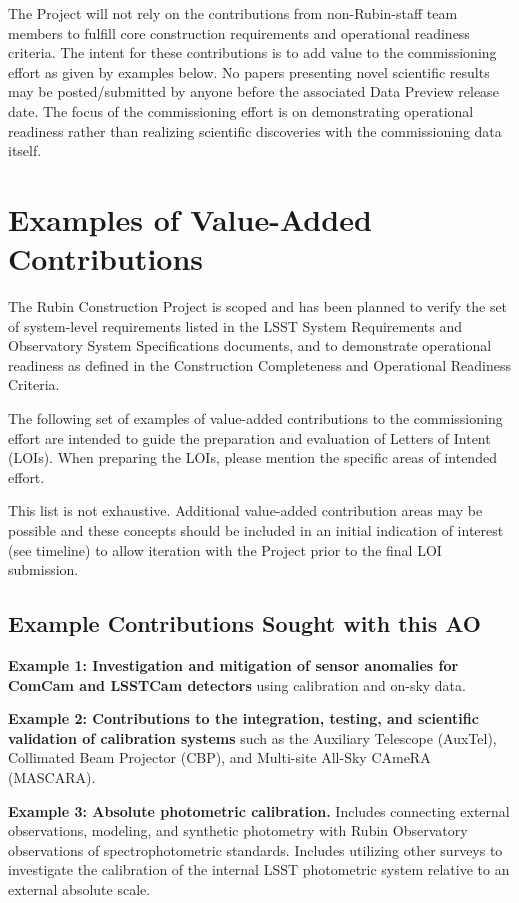 \documentclass[SE,authoryear,toc]{lsstdoc}
\begin{document}
The Project will not rely on the contributions from non-Rubin-staff team members to fulfill core construction requirements and operational readiness criteria. The intent for these contributions is to add value to the commissioning effort as given by examples below.  No papers presenting novel scientific results may be posted/submitted by anyone before the associated Data Preview release date. The focus of the commissioning effort is on demonstrating operational readiness rather than realizing scientific discoveries with the commissioning data itself.

\section{Examples of Value-Added Contributions}

The Rubin Construction Project is scoped and has been planned to verify the set of system-level requirements listed in the LSST System Requirements and Observatory System Specifications documents, and to demonstrate operational readiness as defined in the Construction Completeness and Operational Readiness Criteria. 

The following set of examples of value-added contributions to the commissioning effort are intended to guide the preparation and evaluation of Letters of Intent (LOIs). When preparing the LOIs, please mention the specific areas of intended effort. 

This list is not exhaustive. Additional value-added contribution areas may be possible and these concepts should be included in an initial indication of interest (see timeline) to allow iteration with the Project prior to the final LOI submission.

\subsection{Example Contributions Sought with this AO}

\textbf{Example 1: Investigation and mitigation of sensor anomalies for ComCam and LSSTCam detectors} using calibration and on-sky data.

\textbf{Example 2: Contributions to the integration, testing, and scientific validation of calibration systems} such as the Auxiliary Telescope (AuxTel), Collimated Beam Projector (CBP), and Multi-site All-Sky CAmeRA (MASCARA).

\textbf{Example 3: Absolute photometric calibration.} Includes connecting external observations, modeling, and synthetic photometry with Rubin Observatory observations of  spectrophotometric standards. Includes utilizing other surveys to investigate the calibration of the internal LSST photometric system relative to an external absolute scale.
\end{document}
